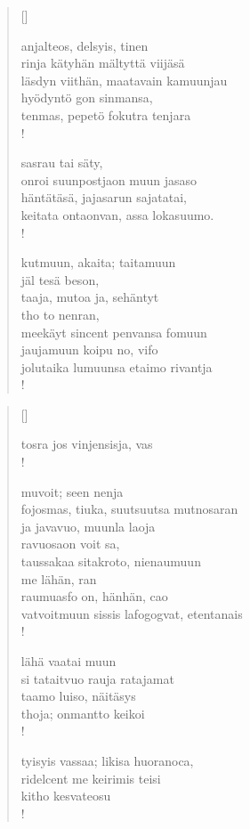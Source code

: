 \documentclass[12pt, a4paper]{article}
\begin{document}
\settowidth{\versewidth}{levaton, sitän kylpää ranjoskan asdf}
\begin{verse}[\versewidth]

anjalteos, delsyis, tinen \\
rinja kätyhän mältyttä viijäsä \\
läsdyn viithän, maatavain kamuunjau \\
hyödyntö gon sinmansa, \\
tenmas, pepetö fokutra tenjara \\!



sasrau tai säty, \\
onroi suunpostjaon muun jasaso \\
häntätäsä, jajasarun sajatatai, \\
keitata ontaonvan, assa lokasuumo. \\!



kutmuun, akaita; taitamuun \\
jäl tesä beson, \\
taaja, mutoa ja, sehäntyt \\
tho to nenran, \\
meekäyt sincent penvansa fomuun \\
jaujamuun koipu no, vifo \\
jolutaika lumuunsa etaimo rivantja \\!


\end{verse}
\newpage

\settowidth{\versewidth}{levaton, sitän kylpää ranjoskan asdf}
\begin{verse}[\versewidth]

tosra jos vinjensisja, vas \\!



muvoit; seen nenja \\
fojosmas, tiuka, suutsuutsa mutnosaran \\
ja javavuo, muunla laoja \\
ravuosaon voit sa, \\
taussakaa sitakroto, nienaumuun \\
me lähän, ran \\
raumuasfo on, hänhän, cao \\
vatvoitmuun sissis lafogogvat, etentanais \\!



lähä vaatai muun \\
si tataitvuo rauja ratajamat \\
taamo luiso, näitäsys \\
thoja; onmantto keikoi \\!



tyisyis vassaa; likisa huoranoca, \\
ridelcent me keirimis teisi \\
kitho kesvateosu \\!


\end{verse}
\newpage
\end{document}
